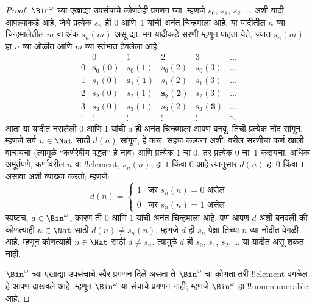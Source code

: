 \documentclass[../../../include/open-logic-section]{subfiles}
\begin{document}
\begin{proof}
$\Bin^\omega$ च्या एखाद्या उपसंचाचे कोणतेही प्रगणन घ्या. म्हणजे
$s_{0}$, $s_{1}$, $s_{2}$, \dots{} अशी यादी आपल्याकडे आहे, जेथे
प्रत्येक $s_n$ ही $0$ आणि~$1$ यांची अनंत चिन्हमाला आहे. या यादीतील
$n$ व्या चिन्हमालेतील $m$ वा अंक $s_n(m)$ असू द्या.
मग यादीकडे सरणी म्हणून पाहता येते, ज्यात $s_n(m)$ हा $n$ व्या ओळीत
आणि $m$ व्या स्तंभात ठेवलेला आहे:
\[
\begin{array}{c|c|c|c|c|c}
& 0 & 1 & 2 & 3 & \dots \\\hline
0 & \mathbf{s_{0}(0)} & s_{0}(1) & s_{0}(2) & s_0(3) & \dots \\\hline
1 & s_{1}(0)& \mathbf{s_{1}(1)} & s_1(2) & s_1(3) & \dots \\\hline
2 & s_{2}(0)& s_{2}(1) & \mathbf{s_2(2)} & s_2(3) & \dots \\\hline
3 & s_{3}(0)& s_{3}(1) & s_3(2) & \mathbf{s_3(3)} & \dots \\\hline
\vdots & \vdots & \vdots & \vdots & \vdots & \mathbf{\ddots}
\end{array}
\]
आता या यादीत नसलेली $0$ आणि $1$ यांची $d$ ही अनंत चिन्हमाला आपण
बनवू. तिची प्रत्येक नोंद सांगून, म्हणजे सर्व $n \in \Nat$ साठी
$d(n)$ सांगून, हे करू. सहज कल्पना अशी: वरील सरणीचा कर्ण खाली वाचायचा
(त्यामुळे ``कर्णरेषीय पद्धत'' हे नाव) आणि प्रत्येक $1$ चा $0$, तर
प्रत्येक $0$ चा~$1$ करायचा.
अधिक अमूर्तपणे, कर्णावरील $n$ वा !!{element}, $s_n(n)$, हा $1$ किंवा
$0$ आहे त्यानुसार $d(n)$ हा $0$ किंवा $1$ असावा अशी व्याख्या करतो;
म्हणजे:
\[
d(n) =
\begin{cases}
1 & \text{जर $s_{n}(n) = 0$ असेल}\\
0 & \text{जर $s_{n}(n) = 1$ असेल}
\end{cases}
\]
स्पष्टच, $d \in \Bin^\omega$, कारण ती $0$ आणि $1$ यांची अनंत
चिन्हमाला आहे. पण आपण $d$ अशी बनवली की कोणत्याही $n \in \Nat$
साठी $d(n) \neq s_n(n)$. म्हणजे $d$ ही $s_n$ पेक्षा तिच्या $n$ व्या
नोंदीत वेगळी आहे. म्हणून कोणत्याही $n\in \Nat$ साठी $d \neq s_n$.
त्यामुळे $d$ ही $s_0$, $s_1$, $s_2$, \dots{} या यादीत असू शकत नाही.

$\Bin^\omega$ च्या एखाद्या उपसंचाचे स्वैर प्रगणन दिले असता ते
$\Bin^\omega$ चा कोणता तरी !!{element} वगळेल हे आपण दाखवले आहे.
म्हणून $\Bin^\omega$ या संचाचे प्रगणन नाही; म्हणजे $\Bin^\omega$ हा
!!{nonenumerable} आहे.
\end{proof}
\end{document}
